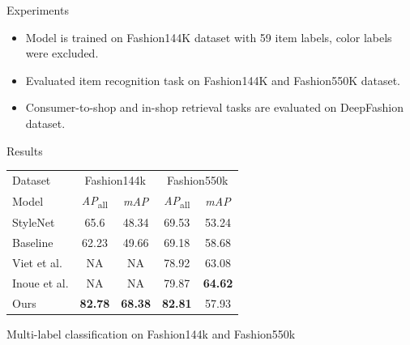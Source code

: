 \documentclass[handout]{beamer}
\begin{document}
\begin{frame}{Experiments}
  \begin{itemize}
    \item Model is trained on Fashion144K dataset with 59 item labels, color labels were excluded.
    \item Evaluated item recognition task on Fashion144K and Fashion550K dataset.
    \item Consumer-to-shop and in-shop retrieval tasks are evaluated on DeepFashion dataset.
  \end{itemize}
\end{frame}

\begin{frame}{Results}
  \begin{table}
    \centering
    \begin{tabular}{ l c c c c}
       \hline
      Dataset & \multicolumn{2}{c}{Fashion144k \cite{SimoSerraCVPR2016}} & \multicolumn{2}{c}{Fashion550k \cite{InoueICCVW2017}} \\
      Model & \textit{AP}\textsubscript{all} & \textit{mAP} & \textit{AP}\textsubscript{all} & \textit{mAP} \\
      \hline
      StyleNet \cite{SimoSerraCVPR2016} & 65.6 & 48.34 & 69.53 & 53.24 \\
      Baseline \cite{InoueICCVW2017} & 62.23 & 49.66 & 69.18 & 58.68 \\
      Viet et al. \cite{veit2017learning} & NA & NA & 78.92 & 63.08 \\
      Inoue et al. \cite{InoueICCVW2017} & NA & NA & 79.87 & \textbf{64.62} \\
      Ours  & \textbf{82.78} & \textbf{68.38} & \textbf{82.81} & 57.93 \\
       \hline
    \end{tabular}
  \end{table}
  Multi-label classification on Fashion144k \cite{SimoSerraCVPR2016} and Fashion550k \cite{InoueICCVW2017}
\end{frame}
\end{document}
